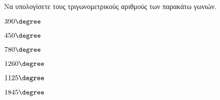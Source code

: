 Να υπολογίσετε τους τριγωνομετρικούς αριθμούς των παρακάτω γωνιών.
\begin{multicols}{3}
\begin{rlist}
\item $ 390\degree $
\item $ 450\degree $
\item $ 780\degree $
\item $ 1260\degree $
\item $ 1125\degree $
\item $ 1845\degree $
\end{rlist}
\end{multicols}
